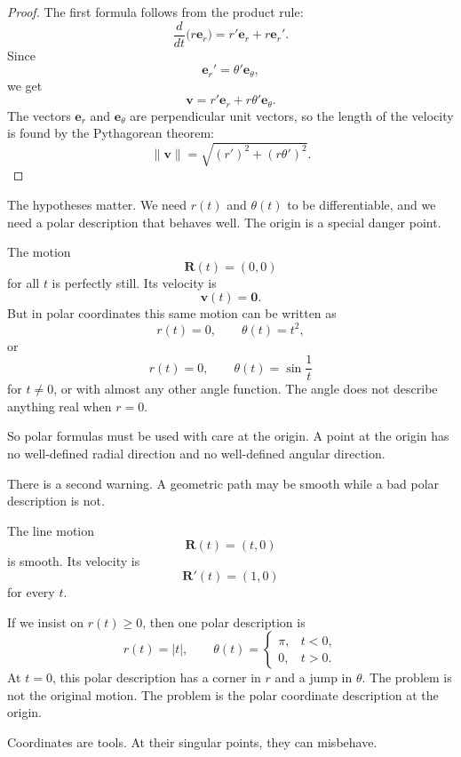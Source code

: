 \begin{proof}
The first formula follows from the product rule:
\[
    \frac{d}{dt}\bigl(r\mathbf e_r\bigr)
    =
    r'\mathbf e_r+r\mathbf e_r'.
\]
Since
\[
    \mathbf e_r'=\theta'\mathbf e_\theta,
\]
we get
\[
    \mathbf v=r'\mathbf e_r+r\theta'\mathbf e_\theta.
\]
The vectors \(\mathbf e_r\) and \(\mathbf e_\theta\) are perpendicular unit vectors, so
the length of the velocity is found by the Pythagorean theorem:
\[
    \|\mathbf v\|=\sqrt{(r')^2+(r\theta')^2}.
\]
\end{proof}

The hypotheses matter.  We need \(r(t)\) and \(\theta(t)\) to be differentiable, and we
need a polar description that behaves well.  The origin is a special danger point.

\begin{example}
The motion
\[
    \mathbf R(t)=(0,0)
\]
for all \(t\) is perfectly still.  Its velocity is
\[
    \mathbf v(t)=\mathbf 0.
\]
But in polar coordinates this same motion can be written as
\[
    r(t)=0,
    \qquad
    \theta(t)=t^2,
\]
or
\[
    r(t)=0,
    \qquad
    \theta(t)=\sin\frac1t
\]
for \(t\ne0\), or with almost any other angle function.  The angle does not describe
anything real when \(r=0\).

So polar formulas must be used with care at the origin.  A point at the origin has no
well-defined radial direction and no well-defined angular direction.
\end{example}

There is a second warning.  A geometric path may be smooth while a bad polar
description is not.

\begin{example}
The line motion
\[
    \mathbf R(t)=(t,0)
\]
is smooth.  Its velocity is
\[
    \mathbf R'(t)=(1,0)
\]
for every \(t\).

If we insist on \(r(t)\ge0\), then one polar description is
\[
    r(t)=|t|,
    \qquad
    \theta(t)=
    \begin{cases}
    \pi, & t<0,\\
    0, & t>0.
    \end{cases}
\]
At \(t=0\), this polar description has a corner in \(r\) and a jump in \(\theta\).  The
problem is not the original motion.  The problem is the polar coordinate description
at the origin.

Coordinates are tools.  At their singular points, they can misbehave.
\end{example}

